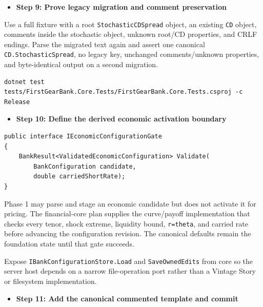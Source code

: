 \documentclass[
  10pt,
  letterpaper,
]{article}
\newcommand{\passthrough}[1]{#1}
\providecommand{\tightlist}{%
  \setlength{\itemsep}{0pt}\setlength{\parskip}{0pt}}
\begin{document}
\begin{itemize}
\tightlist
\item[$\square$]
  \textbf{Step 9: Prove legacy migration and comment preservation}
\end{itemize}

Use a full fixture with a root
\passthrough{\lstinline!StochasticCDSpread!} object, an existing
\passthrough{\lstinline!CD!} object, comments inside the stochastic
object, unknown root/CD properties, and CRLF endings. Parse the migrated
text again and assert one canonical
\passthrough{\lstinline!CD.StochasticSpread!}, no legacy key, unchanged
comments/unknown properties, and byte-identical output on a second
migration.

\begin{lstlisting}
dotnet test tests/FirstGearBank.Core.Tests/FirstGearBank.Core.Tests.csproj -c Release
\end{lstlisting}

\begin{itemize}
\tightlist
\item[$\square$]
  \textbf{Step 10: Define the derived economic activation boundary}
\end{itemize}

\begin{lstlisting}
public interface IEconomicConfigurationGate
{
    BankResult<ValidatedEconomicConfiguration> Validate(
        BankConfiguration candidate,
        double carriedShortRate);
}
\end{lstlisting}

Phase 1 may parse and stage an economic candidate but does not activate
it for pricing. The financial-core plan supplies the curve/payoff
implementation that checks every tenor, shock extreme, liquidity bound,
\passthrough{\lstinline!r=theta!}, and carried rate before advancing the
configuration revision. The canonical defaults remain the foundation
state until that gate succeeds.

Expose \texttt{IBankConfigurationStore.}\allowbreak{}\texttt{Load} and
\passthrough{\lstinline!SaveOwnedEdits!} from core so the server host
depends on a narrow file-operation port rather than a Vintage Story or
filesystem implementation.

\begin{itemize}
\tightlist
\item[$\square$]
  \textbf{Step 11: Add the canonical commented template and commit}
\end{itemize}
\end{document}
